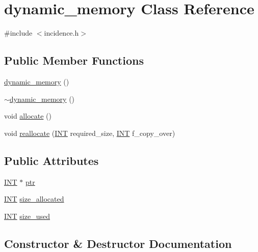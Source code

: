 \hypertarget{classdynamic__memory}{}\section{dynamic\+\_\+memory Class Reference}
\label{classdynamic__memory}


{\ttfamily \#include $<$incidence.\+h$>$}

\subsection*{Public Member Functions}
\begin{DoxyCompactItemize}
\item 
\mbox{\hyperlink{classdynamic__memory_ad37bcd764ef366feb34bcb48192ef4d4}{dynamic\+\_\+memory}} ()
\item 
\mbox{\hyperlink{classdynamic__memory_a67470bdbf754367a87664be38ff84afe}{$\sim$dynamic\+\_\+memory}} ()
\item 
void \mbox{\hyperlink{classdynamic__memory_ad8002b6ce73cb398b72abf2b3169d161}{allocate}} ()
\item 
void \mbox{\hyperlink{classdynamic__memory_abe9a2bb157f057efce1c7dc15b00a09f}{reallocate}} (\mbox{\hyperlink{galois_8h_a09fddde158a3a20bd2dcadb609de11dc}{I\+NT}} required\+\_\+size, \mbox{\hyperlink{galois_8h_a09fddde158a3a20bd2dcadb609de11dc}{I\+NT}} f\+\_\+copy\+\_\+over)
\end{DoxyCompactItemize}
\subsection*{Public Attributes}
\begin{DoxyCompactItemize}
\item 
\mbox{\hyperlink{galois_8h_a09fddde158a3a20bd2dcadb609de11dc}{I\+NT}} $\ast$ \mbox{\hyperlink{classdynamic__memory_ad19e5901bd3964390110632bda51e5d4}{ptr}}
\item 
\mbox{\hyperlink{galois_8h_a09fddde158a3a20bd2dcadb609de11dc}{I\+NT}} \mbox{\hyperlink{classdynamic__memory_a778cf51a23b12b3036c00ddf6248ca82}{size\+\_\+allocated}}
\item 
\mbox{\hyperlink{galois_8h_a09fddde158a3a20bd2dcadb609de11dc}{I\+NT}} \mbox{\hyperlink{classdynamic__memory_ad5509ddef531dd418419274d5b8f7a59}{size\+\_\+used}}
\end{DoxyCompactItemize}


\subsection{Constructor \& Destructor Documentation}
\mbox{\label{classdynamic__memory_ad37bcd764ef366feb34bcb48192ef4d4}} 

